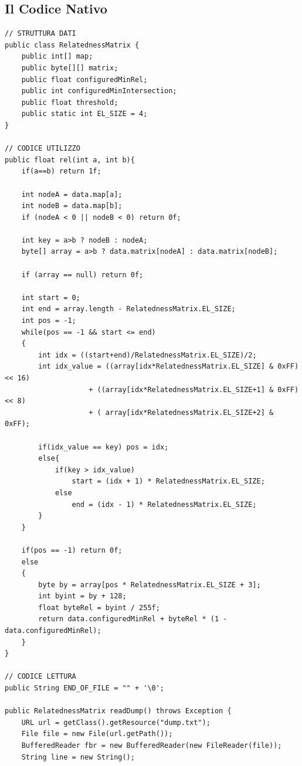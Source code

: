 \subsection{Il Codice Nativo}

\begin{lstlisting}[style=JavaStyle]
// STRUTTURA DATI
public class RelatednessMatrix {
    public int[] map;
    public byte[][] matrix;
    public float configuredMinRel;
    public int configuredMinIntersection;
    public float threshold;
    public static int EL_SIZE = 4;
}

// CODICE UTILIZZO
public float rel(int a, int b){
    if(a==b) return 1f;

    int nodeA = data.map[a];
    int nodeB = data.map[b];
    if (nodeA < 0 || nodeB < 0) return 0f;

    int key = a>b ? nodeB : nodeA;
    byte[] array = a>b ? data.matrix[nodeA] : data.matrix[nodeB];

    if (array == null) return 0f;

    int start = 0;
    int end = array.length - RelatednessMatrix.EL_SIZE;
    int pos = -1;
    while(pos == -1 && start <= end)
    {
        int idx = ((start+end)/RelatednessMatrix.EL_SIZE)/2;
        int idx_value = ((array[idx*RelatednessMatrix.EL_SIZE] & 0xFF) << 16)
                    + ((array[idx*RelatednessMatrix.EL_SIZE+1] & 0xFF) << 8)
                    + ( array[idx*RelatednessMatrix.EL_SIZE+2] & 0xFF);

        if(idx_value == key) pos = idx;
        else{
            if(key > idx_value)
                start = (idx + 1) * RelatednessMatrix.EL_SIZE;
            else
                end = (idx - 1) * RelatednessMatrix.EL_SIZE;
        }
    }

    if(pos == -1) return 0f;
    else
    {
        byte by = array[pos * RelatednessMatrix.EL_SIZE + 3];
        int byint = by + 128;
        float byteRel = byint / 255f;
        return data.configuredMinRel + byteRel * (1 - data.configuredMinRel);
    }
}

// CODICE LETTURA
public String END_OF_FILE = "" + '\0';

public RelatednessMatrix readDump() throws Exception {
    URL url = getClass().getResource("dump.txt");
    File file = new File(url.getPath());
    BufferedReader fbr = new BufferedReader(new FileReader(file));
    String line = new String();


\end{lstlisting}
